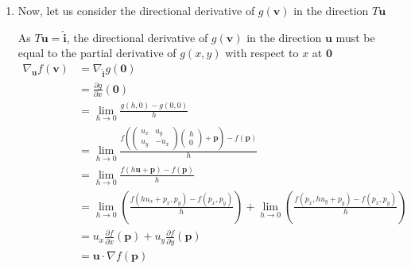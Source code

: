 \documentclass[12pt]{book}
\makeatletter
\newcommand{\rbb}{\mathbb{R}}
\theoremstyle{definitionstyle}
\renewenvironment{proof}[1][\proofname]{\par
  \pushQED{\qed}%
  \normalfont \topsep6\p@\@plus6\p@\relax
  \trivlist
  \item[\hskip\labelsep
		\bfseries
	#1\@addpunct{.}]\ignorespaces
}{
  \popQED\endtrivlist\@endpefalse
}
\numberwithin{equation}{section}
\makeatother
\begin{document}
\begin{proof}[Proof of Theorem \ref{directional-derivative-thm} for scalar value functions on $\rbb^2$]
\begin{enumerate}
	    Let $\func{g}{\rbb^m}{\rbb}$ be our transformed function
	    \begin{equation}
		\begin{split}
			     & g(\mathbf{v}) = f(T\mathbf{v}+\mathbf{p}) \\
		    \implies & g(\mathbf{0}) = f(\mathbf{p})\text{, and} \\
			     & g(\mathbf{u}) = f(\mathbf{\hat{i}}).
		\end{split}
	    \end{equation}

	\item Now, let us consider the directional derivative of $g(\mathbf{v})$ in the direction $T\mathbf{u}$
	    
	    As $T\mathbf{u} = \mathbf{\hat{i}}$, the directional derivative of $g(\mathbf{v})$ in the direction $\mathbf{u}$ must be equal to the partial derivative of $g(x,y)$ with respect to $x$ at $\mathbf{0}$
	    \begin{equation}
		\begin{split}
		\nabla_{\mathbf{u}}f(\mathbf{v})
		    & = \nabla_{\mathbf{\hat{i}}}g(\mathbf{0}) \\
		    & = \frac{\partial g}{\partial x}(\mathbf{0}) \\
		    & = \lim_{h \to 0} \frac{g(h,0) - g(0,0)}{h} \\
		    & = \lim_{h \to 0} \frac{f\left(\begin{pmatrix} u_x & u_y \\ u_y & -u_x\end{pmatrix}\begin{pmatrix} h \\ 0 \end{pmatrix} + \mathbf{p}\right) - f(\mathbf{p})}{h} \\
		    & = \lim_{h \to 0} \frac{f(h\mathbf{u} + \mathbf{p}) - f(\mathbf{p})}{h} \\
		    & = \lim_{h \to 0}\left(\frac{f(hu_x + p_x, p_y) - f(p_x, p_y)}{h}\right) + \lim_{h \to 0}\left(\frac{f(p_x, hu_y + p_y) - f(p_x, p_y)}{h}\right) \\
		    & = u_x\frac{\partial f}{\partial x}(\mathbf{p}) + u_y\frac{\partial f}{\partial y}(\mathbf{p}) \\
		    & = \mathbf{u} \cdot \nabla f(\mathbf{p})
		\end{split}
	    \end{equation}
    \end{enumerate}
\end{proof}
\end{document}
